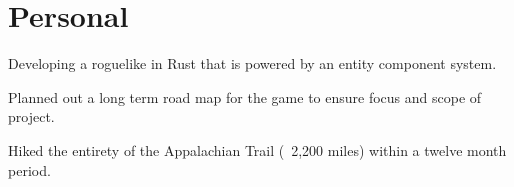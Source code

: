 \documentclass{playground}
\begin{document}
	\section{Personal}
			\resumesublistbegin
				\item Developing a roguelike in Rust that is powered by an entity component system.
				\item Planned out a long term road map for the game to ensure focus and scope of project.
			\resumesublistend
			\resumesublistbegin
				\item Hiked the entirety of the Appalachian Trail (~2,200 miles) within a twelve month period.
			\resumesublistend
\end{document}

